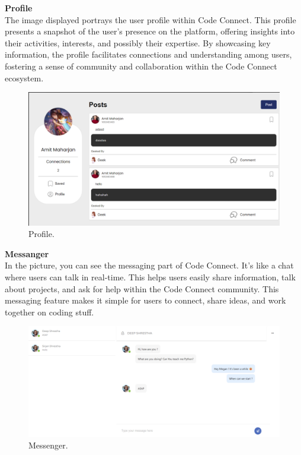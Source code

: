 \textbf{Profile}
\\The image displayed portrays the user profile within Code Connect. This profile presents a snapshot of the user's presence on the platform, offering insights into their activities, interests, and possibly their expertise. By showcasing key information, the profile facilitates connections and understanding among users, fostering a sense of community and collaboration within the Code Connect ecosystem.
\begin{figure}[ht]
    \centering
    \includegraphics[width=1\textwidth]{Outcome-ss/self-profile.png}
    \caption{Profile.}
    \label{fig:Profile}
\end{figure}
\newpage
\textbf{Messanger}
\\In the picture, you can see the messaging part of Code Connect. It's like a chat where users can talk in real-time. This helps users easily share information, talk about projects, and ask for help within the Code Connect community. This messaging feature makes it simple for users to connect, share ideas, and work together on coding stuff.
\begin{figure}[ht]
    \centering
    \includegraphics[width=1\textwidth]{Outcome-ss/messanger.png}
    \caption{Messenger.}
    \label{fig:Messenger}
\end{figure}


